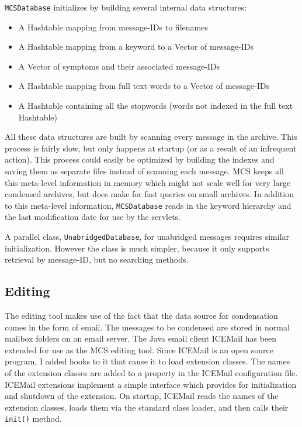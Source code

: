 {\tt MCSDatabase} initializes by building several internal data structures:
\begin{itemize}
\item A Hashtable mapping from message-IDs to filenames
\item A Hashtable mapping from a keyword to a Vector of message-IDs
\item A Vector of symptoms and their associated message-IDs
\item A Hashtable mapping from full text words to a Vector of message-IDs
\item A Hashtable containing all the stopwords (words not indexed in the full
  text Hashtable)
\end{itemize}

All these data structures are built by scanning every message in the archive.
This process is fairly slow, but only happens at startup (or as a result of an
infrequent action). This process could easily be optimized by building the
indexes and saving them as separate files instead of scanning each message. MCS
keeps all this meta-level information in memory which might not scale well for
very large condensed archives, but does make for fast queries on small
archives. In addition to this meta-level information, {\tt MCSDatabase} reads
in the keyword hierarchy and the last modification date for use by the
servlets.

A parallel class, {\tt UnabridgedDatabase}, for unabridged messages requires
similar initialization. However the class is much simpler, because it only
supports retrieval by message-ID, but no searching methods.

\subsection{Editing}
The editing tool makes use of the fact that the data source for condensation
comes in the form of email. The messages to be condensed are stored in normal
mailbox folders on an email server. The Java email client ICEMail
\cite{icemail-website} has been extended for use as the MCS editing tool. Since
ICEMail is an open source program, I added hooks to it that cause it to load
extension classes. The names of the extension classes are added to a property
in the ICEMail configuration file. ICEMail extensions implement a simple
interface which provides for initialization and shutdown of the extension. On
startup, ICEMail reads the names of the extension classes, loads them via the
standard class loader, and then calls their {\tt init()} method.


